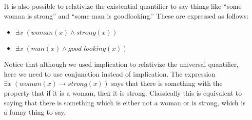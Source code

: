 \documentclass[letterpaper,10pt,english]{sphinxmanual}
\begin{document}
\sphinxAtStartPar
It is also possible to relativize the existential quantifier to say things like “some woman is strong” and “some man is good\sphinxhyphen{}looking.” These are expressed as follows:
\begin{itemize}
\item {} 
\sphinxAtStartPar
\(\exists x \; (\mathit{woman}(x) \wedge \mathit{strong}(x))\)

\item {} 
\sphinxAtStartPar
\(\exists x \; (\mathit{man}(x) \wedge \mathit{good\mathord{\mbox{-}}looking}(x))\)

\end{itemize}

\sphinxAtStartPar
Notice that although we used implication to relativize the universal quantifier, here we need to use conjunction instead of implication. The expression \(\exists x \; (\mathit{woman}(x) \to \mathit{strong}(x))\) says that there is something with the property that if it is a woman, then it is strong. Classically this is equivalent to saying that there is something which is either not a woman or is strong, which is a funny thing to say.
\end{document}
